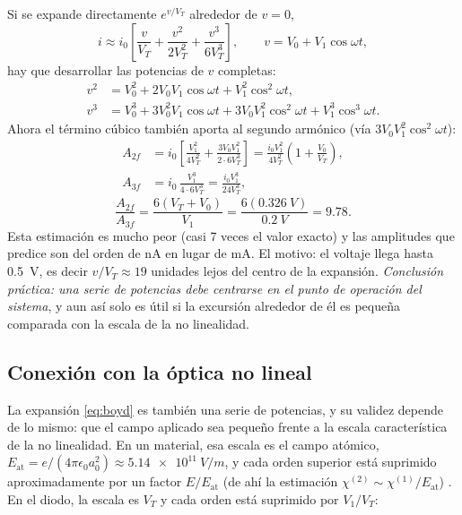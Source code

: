 \documentclass[11pt,letterpaper]{article}
\newcommand{\VT}{V_T}
\begin{document}
Si se expande directamente $e^{v/\VT}$ alrededor de $v=0$,
\begin{equation}
  i\approx i_0\left[\frac{v}{\VT}+\frac{v^2}{2\VT^2}+\frac{v^3}{6\VT^3}\right],\qquad v=V_0+V_1\cos\omega t,
\end{equation}
hay que desarrollar las potencias de $v$ completas:
\begin{align}
  v^2 &= V_0^2+2V_0V_1\cos\omega t+V_1^2\cos^2\omega t,\\
  v^3 &= V_0^3+3V_0^2V_1\cos\omega t+3V_0V_1^2\cos^2\omega t+V_1^3\cos^3\omega t .
\end{align}
Ahora el término cúbico también aporta al segundo armónico (vía $3V_0V_1^2\cos^2\omega t$):
\begin{align}
  A_{2f} &= i_0\left[\frac{V_1^2}{4\VT^2}+\frac{3V_0V_1^2}{2\cdot6\VT^3}\right]=\frac{i_0V_1^2}{4\VT^2}\left(1+\frac{V_0}{\VT}\right),\\
  A_{3f} &= i_0\,\frac{V_1^3}{4\cdot6\VT^3}=\frac{i_0V_1^3}{24\VT^3},
\end{align}
\begin{equation}
  \frac{A_{2f}}{A_{3f}}=\frac{6(\VT+V_0)}{V_1}=\frac{6(\SI{0.326}{V})}{\SI{0.2}{V}}=9.78 .
\end{equation}
Esta estimación es mucho peor (casi 7 veces el valor exacto) y las amplitudes que predice son del orden de
nA en lugar de mA. El motivo: el voltaje llega hasta \SI{0.5}{V}, es decir $v/\VT\approx19$ unidades
lejos del centro de la expansión. \emph{Conclusión práctica: una serie de potencias debe centrarse en el
punto de operación del sistema}, y aun así solo es útil si la excursión alrededor de él es pequeña
comparada con la escala de la no linealidad.

\subsection{Conexión con la óptica no lineal}

La expansión \eqref{eq:boyd} es también una serie de potencias, y su validez depende de lo mismo: que el
campo aplicado sea pequeño frente a la escala característica de la no linealidad. En un material, esa
escala es el campo atómico, $E_{\text{at}}=e/(4\pi\epsilon_0a_0^2)\approx\SI{5.14e11}{V/m}$, y cada orden
superior está suprimido aproximadamente por un factor $E/E_{\text{at}}$ (de ahí la estimación
$\chi^{(2)}\sim\chi^{(1)}/E_{\text{at}}$) \cite[p.~3]{boyd}. En el diodo, la escala es $\VT$ y cada orden
está suprimido por $V_1/\VT$:
\end{document}
